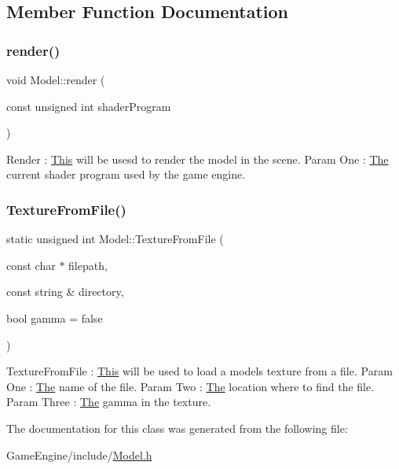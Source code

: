 \subsection{Member Function Documentation}
\mbox{\label{class_model_a0885da76930d0f3b919eaa10ae08e8ab}} 
\subsubsection{\texorpdfstring{render()}{render()}}
{\footnotesize\ttfamily void Model\+::render (\begin{DoxyParamCaption}\item[{const unsigned int}]{shader\+Program }\end{DoxyParamCaption})}

Render \+: \mbox{\hyperlink{class_this}{This}} will be usesd to render the model in the scene. Param One \+: \mbox{\hyperlink{class_the}{The}} current shader program used by the game engine. \mbox{\label{class_model_a16c263d87f6368d21d5ab255468c2c90}} 
\subsubsection{\texorpdfstring{Texture\+From\+File()}{TextureFromFile()}}
{\footnotesize\ttfamily static unsigned int Model\+::\+Texture\+From\+File (\begin{DoxyParamCaption}\item[{const char $\ast$}]{filepath,  }\item[{const string \&}]{directory,  }\item[{bool}]{gamma = {\ttfamily false} }\end{DoxyParamCaption})\hspace{0.3cm}{\ttfamily [static]}}

Texture\+From\+File \+: \mbox{\hyperlink{class_this}{This}} will be used to load a model\textquotesingle{}s texture from a file. Param One \+: \mbox{\hyperlink{class_the}{The}} name of the file. Param Two \+: \mbox{\hyperlink{class_the}{The}} location where to find the file. Param Three \+: \mbox{\hyperlink{class_the}{The}} gamma in the texture. 

The documentation for this class was generated from the following file\+:\begin{DoxyCompactItemize}
\item 
Game\+Engine/include/\mbox{\hyperlink{_model_8h}{Model.\+h}}\end{DoxyCompactItemize}
